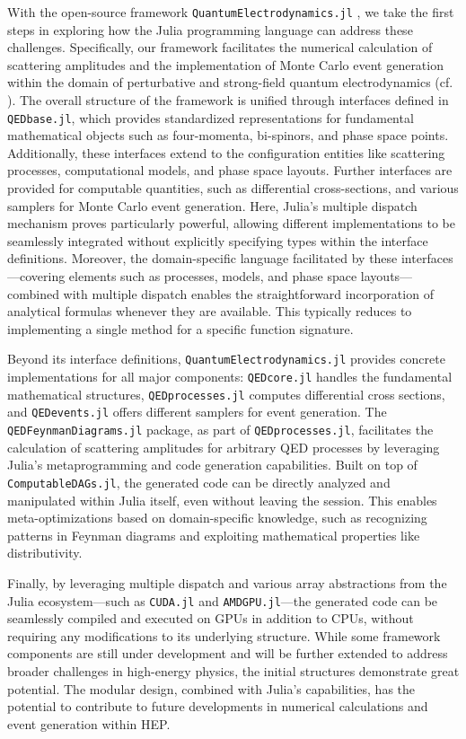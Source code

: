 \documentclass{webofc}
\begin{document}
With the open-source framework \texttt{QuantumElectrodynamics.jl} \cite{qedjl-github}, we take the first steps in exploring
how the Julia programming language can address these challenges. Specifically, our framework
facilitates the numerical calculation of scattering amplitudes and the implementation of Monte
Carlo event generation within the domain of perturbative and strong-field quantum electrodynamics (cf. \cite{Fedotov:2022ely}).
The overall structure of the framework is unified through interfaces defined in \texttt{QEDbase.jl}, which provides
standardized representations for fundamental mathematical objects such as four-momenta, bi-spinors, and
phase space points. Additionally, these interfaces extend to the configuration entities like scattering processes,
computational models, and phase space layouts.
Further interfaces are provided for computable quantities, such as differential cross-sections,
and various samplers for Monte Carlo event generation. Here, Julia’s multiple dispatch mechanism
proves particularly powerful, allowing different implementations to be seamlessly integrated without explicitly
specifying types within the interface definitions. Moreover, the domain-specific language facilitated by
these interfaces—covering elements such as processes, models, and phase space layouts—combined with
multiple dispatch enables the straightforward incorporation of analytical formulas whenever they are available.
This typically reduces to implementing a single method for a specific function signature.

Beyond its interface definitions, \texttt{QuantumElectrodynamics.jl} provides concrete implementations for all
major components: \texttt{QEDcore.jl} handles the fundamental mathematical structures, \texttt{QEDprocesses.jl} computes
differential cross sections, and \texttt{QEDevents.jl} offers different samplers for event generation.
The \texttt{QEDFeynmanDiagrams.jl} package, as part of \texttt{QEDprocesses.jl}, facilitates the calculation of
scattering amplitudes for arbitrary QED processes by leveraging Julia’s metaprogramming and code generation
capabilities. Built on top of \texttt{ComputableDAGs.jl}, the generated code can be directly analyzed and manipulated
within Julia itself, even without leaving the session. This enables meta-optimizations based on domain-specific knowledge, such as recognizing patterns in Feynman diagrams and exploiting mathematical properties like distributivity.

Finally, by leveraging multiple dispatch and various array abstractions from the Julia ecosystem—such as \texttt{CUDA.jl}
and \texttt{AMDGPU.jl}—the generated code can be seamlessly compiled and executed on GPUs in addition to CPUs, without
requiring any modifications to its underlying structure.
While some framework components are still under development and will be further extended to address
broader challenges in high-energy physics, the initial structures demonstrate great potential. The modular design,
combined with Julia’s capabilities, has the potential to contribute to future developments in numerical calculations
and event generation within HEP.
\end{document}
